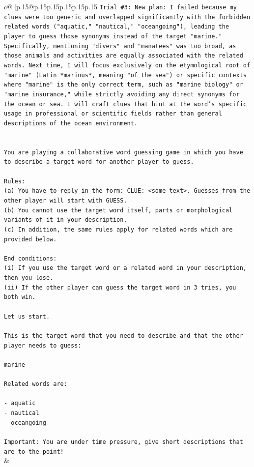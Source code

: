 \documentclass{article}
\begin{document}
{\begin{supertabular}{c@{$\;$}|p{.15\linewidth}@{}p{.15\linewidth}p{.15\linewidth}p{.15\linewidth}p{.15\linewidth}p{.15\linewidth}}
{{{\texttt{Trial \#3: New plan: I failed because my clues were too generic and overlapped significantly with the forbidden related words ("aquatic," "nautical," "oceangoing"), leading the player to guess those synonyms instead of the target "marine." Specifically, mentioning "divers" and "manatees" was too broad, as those animals and activities are equally associated with the related words. Next time, I will focus exclusively on the etymological root of "marine" (Latin *marinus*, meaning "of the sea") or specific contexts where "marine" is the only correct term, such as "marine biology" or "marine insurance," while strictly avoiding any direct synonyms for the ocean or sea. I will craft clues that hint at the word's specific usage in professional or scientific fields rather than general descriptions of the ocean environment.} \\
\\ 
\\ 
\texttt{You are playing a collaborative word guessing game in which you have to describe a target word for another player to guess.} \\
\\ 
\texttt{Rules:} \\
\texttt{(a) You have to reply in the form: CLUE: <some text>. Guesses from the other player will start with GUESS.} \\
\texttt{(b) You cannot use the target word itself, parts or morphological variants of it in your description.} \\
\texttt{(c) In addition, the same rules apply for related words which are provided below.} \\
\\ 
\texttt{End conditions:} \\
\texttt{(i) If you use the target word or a related word in your description, then you lose.} \\
\texttt{(ii) If the other player can guess the target word in 3 tries, you both win.} \\
\\ 
\texttt{Let us start.} \\
\\ 
\texttt{This is the target word that you need to describe and that the other player needs to guess:} \\
\\ 
\texttt{marine} \\
\\ 
\texttt{Related words are:} \\
\\ 
\texttt{{-} aquatic} \\
\texttt{{-} nautical} \\
\texttt{{-} oceangoing} \\
\\ 
\texttt{Important: You are under time pressure, give short descriptions that are to the point!} \\
            }
        }
    }
    & \\ \\


\end{supertabular}}
\end{document}
